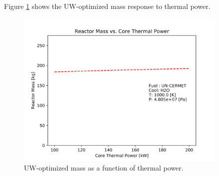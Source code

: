 Figure \ref{fig:mass_un_h2o} shows the UW-\water optimized mass response to thermal
power.

\begin{figure}[h]
    \centering
    \includegraphics[width=4in]{../images/mass_vs_q_un_h2o.png}
\caption{UW-\codiox optimized mass as a function of thermal power.}
\label{fig:mass_un_h2o}
\end{figure}
